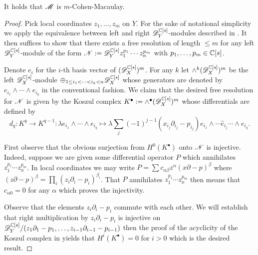 \begin{proposition}\label{prop: CM}
  It holds that $\mathscr{M}$ is $m$-Cohen-Macaulay.
\end{proposition}
\begin{proof}
  Pick local coordinates $z_1,\ldots, z_m$ on $Y$.
  For the sake of notational simplicity we apply the equivalence between left and right $\mathscr{D}_Y^{\mathbb{C}[s]}$-modules described in .
  It then suffices to show that there exists a free resolution of length $\leq m$ for any left $\mathscr{D}_Y^{\mathbb{C}[s]}$-module of the form $\mathscr{N}:= \mathscr{D}_Y^{\mathbb{C}[s]}z_1^{p_1}\cdots z_n^{p_m}$ with $p_1,\ldots, p_m\in \mathbb{C}[s]$.

  Denote $e_i$ for the $i$-th basis vector of $(\mathscr{D}_X^{\mathbb{C}[s]})^m$.
  For any $k$ let $\wedge^k (\mathscr{D}_X^{\mathbb{C}[s]})^m$ be the left $\mathscr{D}_X^{\mathbb{C}[s]}$-module $\oplus_{1\leq i_1 < \cdots < i_k <n}\mathscr{D}_X^{\mathbb{C}[s]}$ whose generators are denoted by $e_{i_1}\wedge \cdots \wedge e_{i_q}$ in the conventional fashion.
  We claim that the desired free resolution for $\mathscr{N}$ is given by the Koszul complex $K^\bullet := \wedge^\bullet (\mathscr{D}_X^{\mathbb{C}[s]})^m$ whose differentials are defined by
  $$d_q :K^q \to K^{q-1}:\lambda e_{i_1}\wedge \cdots \wedge e_{i_q} \mapsto \lambda \sum_{j} (-1)^{j-1} (x_{i_j} \partial_{i_j} - p_{i_j})e_{i_1}\wedge \cdots \hat{e}_{i_j} \cdots \wedge e_{i_q}.$$

  First observe that the obvious surjection from $H^0(K^\bullet)$ onto $\mathscr{N}$ is injective.
  Indeed, suppose we are given some differential operator $P$ which annihilates $z_1^{p_1}\cdots z_n^{p_m}$.
  In local coordinates we may write $P = \sum c_{\alpha \beta} z^\alpha (x\partial - p)^\beta$ where $(z\partial - p)^\beta = \prod_i (z_i \partial_i - p_i)^{\beta_i}$.
  That $P$ annihilates $z_1^{p_1}\cdots z_n^{p_m}$ then means that $c_{\alpha 0}=0$ for any $\alpha$ which proves the injectivity.

  Observe that the elements $z_i \partial_i - p_i$ commute with each other.
  We will establish that right multiplication by $z_i\partial_i - p_i$ is injective on $\mathscr{D}_Y^{\mathbb{C}[s]}/(z_1\partial_1 - p_1,\ldots, z_{i-1}\partial_{i-1} - p_{i-1} )$ then the proof of the acyclicity of the Koszul complex in \cite[Corollary 4.5.4]{weibel1995introduction} yields that $H^i(K^\bullet)= 0$ for $i>0$ which is the desired result.


\end{proof}
